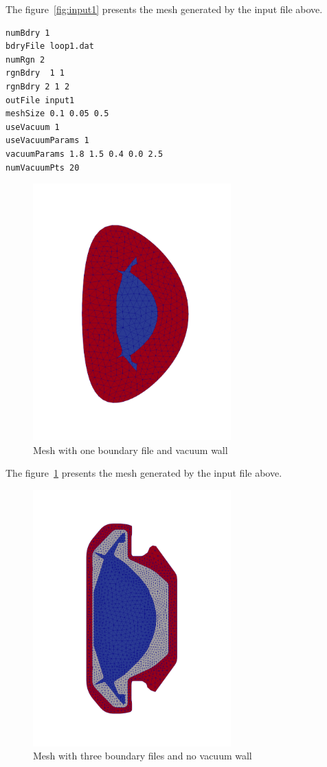 The figure~\ref{fig:input1} presents the mesh generated by the input file above.

\begin{verbatim}
numBdry 1
bdryFile loop1.dat
numRgn 2
rgnBdry  1 1
rgnBdry 2 1 2
outFile input1
meshSize 0.1 0.05 0.5
useVacuum 1
useVacuumParams 1
vacuumParams 1.8 1.5 0.4 0.0 2.5
numVacuumPts 20
\end{verbatim}

\begin{figure}
\centering
\includegraphics[width=3in]{./figures/meshgen-input1.pdf}
\caption[Mesh with one boundary file and vacuum wall]
{Mesh with one boundary file and vacuum wall}
\label{fig:input1-vacuum}
\end{figure}

The figure~\ref{fig:input1-vacuum} presents the mesh generated by the input file above.

\begin{figure}
\centering
\includegraphics[width=3in]{./figures/meshgen-input3-novacuum.pdf}
\caption[Mesh with three boundary files and no vacuum wall]
{Mesh with three boundary files and no vacuum wall}
\label{fig:input3-novacuum}
\end{figure}

